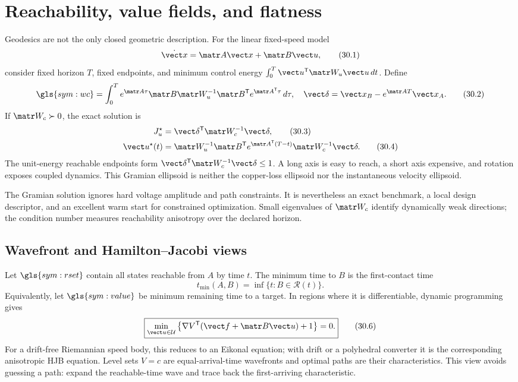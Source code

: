 \section{Reachability, value fields, and flatness}
\label{sec:reachability-hjb}

Geodesics are not the only closed geometric description.  For the linear
fixed-speed model
\[
 \dot{\vect x}=\matr A\vect x+\matr B\vect u,
 \tag{30.1}
\]
consider fixed horizon \(T\), fixed endpoints, and minimum control energy
\(\int_0^T\vect u^{\mathsf T}\matr W_u\vect u\,dt\).  Define
\[
 \gls{sym:wc}=\int_0^T e^{\matr A\tau}\matr B\matr W_u^{-1}
 \matr B^{\mathsf T}e^{\matr A^{\mathsf T}\tau}\,d\tau,
 \quad
 \vect\delta=\vect x_B-e^{\matr A T}\vect x_A.
 \tag{30.2}
\]
If \(\matr W_c\succ0\), the exact solution is
\begin{align}
 J_u^\star&=\vect\delta^{\mathsf T}\matr W_c^{-1}\vect\delta,
 \tag{30.3}\\
 \vect u^\star(t)&=\matr W_u^{-1}\matr B^{\mathsf T}
 e^{\matr A^{\mathsf T}(T-t)}\matr W_c^{-1}\vect\delta.
 \tag{30.4}
\end{align}
The unit-energy reachable endpoints form
\(\vect\delta^{\mathsf T}\matr W_c^{-1}\vect\delta\leq1\).  A long axis is
easy to reach, a short axis expensive, and rotation exposes coupled dynamics.
This Gramian ellipsoid is neither the copper-loss ellipsoid nor the
instantaneous velocity ellipsoid.



The Gramian solution ignores hard voltage amplitude and path constraints.  It
is nevertheless an exact benchmark, a local design descriptor, and an
excellent warm start for constrained optimization.  Small eigenvalues of
\(\matr W_c\) identify dynamically weak directions; the condition number
measures reachability anisotropy over the declared horizon.

\subsection{Wavefront and Hamilton--Jacobi views}

Let \(\gls{sym:rset}\) contain all states reachable from \(A\) by time \(t\).
The minimum time to \(B\) is the first-contact time
\[
 t_{\min}(A,B)=\inf\{t:B\in\mathcal R(t)\}.
 \tag{30.5}
\]
Equivalently, let \(\gls{sym:value}\) be minimum remaining time to a target.
In regions where it is differentiable, dynamic programming gives
\[
 \boxed{\min_{\vect u\in\mathcal U}
 \left\{\nabla V^{\mathsf T}(\vect f+\matr B\vect u)+1\right\}=0.}
 \tag{30.6}
\]
For a drift-free Riemannian speed body, this reduces to an Eikonal equation;
with drift or a polyhedral converter it is the corresponding anisotropic HJB
equation.  Level sets \(V=c\) are equal-arrival-time wavefronts and optimal
paths are their characteristics.  This view avoids guessing a path: expand
the reachable-time wave and trace back the first-arriving characteristic.

